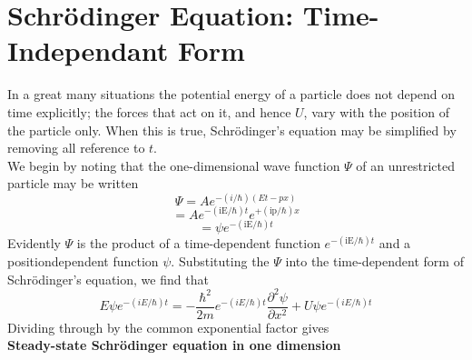 \begin{center}
\end{center}
\section{Schrödinger Equation: Time-Independant Form}
In a great many situations the potential energy of a particle does not depend on time explicitly; the forces that act on it, and hence $U$, vary with the position of the particle only. When this is true, Schrödinger's equation may be simplified by removing all reference to $t$.\\
We begin by noting that the one-dimensional wave function $\Psi$ of an unrestricted particle may be written\\
$$\Psi=A e^{-(i / \hbar)(E t-p x)}$$
$$=A e^{-(\mathrm{iE} / \hbar) t} e^{+(\mathrm{ip} / \hbar) x}$$
$$=\psi e^{-(\mathrm{iE} / \hbar) t}$$
Evidently $\Psi$ is the product of a time-dependent function $e^{-(\mathrm{iE} / \hbar) t}$ and a positiondependent function $\psi$. Substituting the $\Psi$  into the time-dependent form of Schrödinger's equation, we find that
$$E \psi e^{-(i E / \hbar) t}=-\frac{\hbar^{2}}{2 m} e^{-(i E / \hbar) t} \frac{\partial^{2} \psi}{\partial x^{2}}+U \psi e^{-(i E / \hbar) t}$$
Dividing through by the common exponential factor gives \\
\textbf{Steady-state
	Schrödinger equation in one dimension}\\
 \begin{center}
\end{center}

